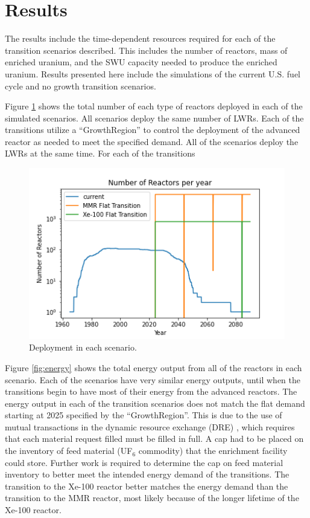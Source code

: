 \section{Results}

The results include the time-dependent resources required 
for each of the transition scenarios described. This includes 
the number of reactors, mass of enriched uranium, and the 
\gls{SWU} capacity needed to produce the enriched uranium.
Results presented here include the simulations of the 
current U.S. fuel cycle and no growth transition scenarios. 

Figure \ref{fig:rx_deployment} shows the total number 
of each type of reactors deployed in each of the simulated 
scenarios. All scenarios deploy the same number of \gls{LWR}s. 
Each of the transitions utilize a \Cycamore ``GrowthRegion'' 
to control the deployment of the advanced reactor as needed 
to meet the specified demand. All of the scenarios deploy the 
\gls{LWR}s at the same time. For each of the transitions 


\begin{figure}[ht]
    \centering
    \includegraphics[scale=0.5]{figures/rx_deployment_all.png}
    \caption{Deployment  in each scenario.}
    \label{fig:rx_deployment}
\end{figure}

Figure \ref{fig:energy} shows the total energy output from 
all of the reactors in each scenario. Each of the scenarios
have very similar energy outputs, until  when the transitions 
begin to have most of their energy from the advanced reactors.
The energy output in 
each of the transition scenarios does not match the flat demand 
starting at 2025 specified by the \Cycamore ``GrowthRegion''. 
This is due to 
the use of mutual transactions in the dynamic resource exchange
(DRE) \cite{gidden_methodology_2016}, which requires that each 
material request filled must be filled in full. A cap had to be 
placed on the inventory of feed material (UF$_6$ commodity) that 
the enrichment facility could store. Further work is required 
to determine the cap on feed material inventory to better meet 
the intended energy demand of the transitions. The transition to 
the Xe-100 reactor better matches the energy demand than the 
transition to the \gls{MMR} reactor, most likely because of the 
longer lifetime of the Xe-100 reactor. 

